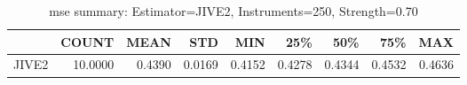 \begin{table}[ht]
\centering
\caption{mse summary: Estimator=JIVE2, Instruments=250, Strength=0.70}
\begin{tabular}{lrrrrrrrr}
\toprule
 & COUNT & MEAN & STD & MIN & 25\% & 50\% & 75\% & MAX \\
\midrule
JIVE2 & 10.0000 & 0.4390 & 0.0169 & 0.4152 & 0.4278 & 0.4344 & 0.4532 & 0.4636 \\
\bottomrule
\end{tabular}
\end{table}

